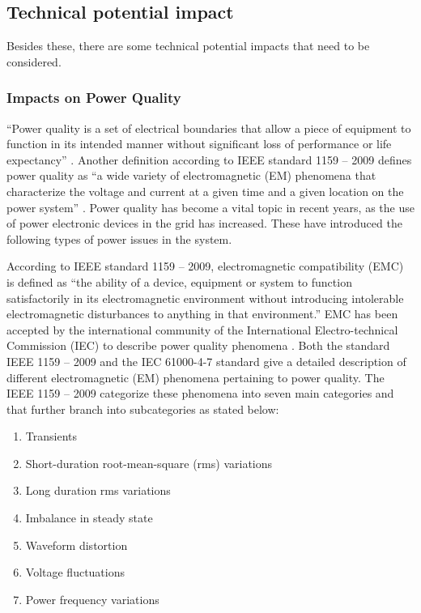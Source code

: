 \subsection{Technical potential impact}
Besides these, there are some technical potential impacts that need to be considered.

\subsubsection{Impacts on Power Quality}
“Power quality is a set of electrical boundaries that allow a piece of equipment to function in its intended manner without significant loss of performance or life expectancy” \cite{TPI1}. Another definition according to IEEE standard 1159 – 2009 defines power quality as “a wide variety of electromagnetic (EM) phenomena that characterize the voltage and current at a given time and a given location on the power system” \cite{TPI2}.  Power quality has become a vital topic in recent years, as the use of power electronic devices in the grid has increased. These have introduced the following types of power issues in the system.

According to IEEE standard 1159 – 2009, electromagnetic compatibility (EMC) is defined as “the ability of a device, equipment or system to function satisfactorily in its electromagnetic environment without introducing intolerable electromagnetic disturbances to anything in that environment.”  EMC has been accepted by the international community of the International Electro-technical Commission (IEC) to describe power quality phenomena \cite{TPI2}. Both the standard IEEE 1159 – 2009 and the IEC 61000-4-7 standard give a detailed description of different electromagnetic (EM) phenomena pertaining to power quality. The IEEE 1159 – 2009 categorize these phenomena into seven main categories and that further branch into subcategories as stated below:
\begin{enumerate}
    \item Transients
    \item Short-duration root-mean-square (rms) variations
    \item Long duration rms variations
    \item Imbalance in steady state
    \item Waveform distortion
    \item Voltage fluctuations 
    \item Power frequency variations
\end{enumerate}

